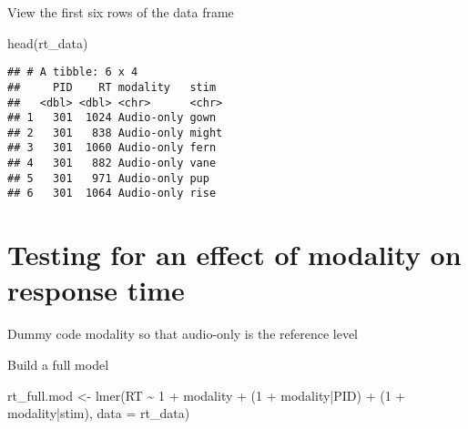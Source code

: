 \documentclass[
]{article}
\newenvironment{Shaded}{\begin{snugshade}}{\end{snugshade}}
\newcommand{\AttributeTok}[1]{\textcolor[rgb]{0.77,0.63,0.00}{#1}}
\newcommand{\DecValTok}[1]{\textcolor[rgb]{0.00,0.00,0.81}{#1}}
\newcommand{\FunctionTok}[1]{\textcolor[rgb]{0.00,0.00,0.00}{#1}}
\newcommand{\NormalTok}[1]{#1}
\newcommand{\OtherTok}[1]{\textcolor[rgb]{0.56,0.35,0.01}{#1}}
\newcommand{\SpecialCharTok}[1]{\textcolor[rgb]{0.00,0.00,0.00}{#1}}
\newcommand{\StringTok}[1]{\textcolor[rgb]{0.31,0.60,0.02}{#1}}
\begin{document}
View the first six rows of the data frame

\begin{Shaded}
\begin{Highlighting}[]
\FunctionTok{head}\NormalTok{(rt\_data)}
\end{Highlighting}
\end{Shaded}

\begin{verbatim}
## # A tibble: 6 x 4
##     PID    RT modality   stim 
##   <dbl> <dbl> <chr>      <chr>
## 1   301  1024 Audio-only gown 
## 2   301   838 Audio-only might
## 3   301  1060 Audio-only fern 
## 4   301   882 Audio-only vane 
## 5   301   971 Audio-only pup  
## 6   301  1064 Audio-only rise
\end{verbatim}

\hypertarget{testing-for-an-effect-of-modality-on-response-time}{%
\section{Testing for an effect of modality on response
time}\label{testing-for-an-effect-of-modality-on-response-time}}

Dummy code modality so that audio-only is the reference level

\begin{Shaded}
\end{Shaded}

Build a full model

\begin{Shaded}
\begin{Highlighting}[]
\NormalTok{rt\_full.mod }\OtherTok{\textless{}{-}} \FunctionTok{lmer}\NormalTok{(RT }\SpecialCharTok{\textasciitilde{}} \DecValTok{1} \SpecialCharTok{+}\NormalTok{ modality }\SpecialCharTok{+} 
\NormalTok{                      (}\DecValTok{1} \SpecialCharTok{+}\NormalTok{ modality}\SpecialCharTok{|}\NormalTok{PID) }\SpecialCharTok{+}\NormalTok{ (}\DecValTok{1} \SpecialCharTok{+}\NormalTok{ modality}\SpecialCharTok{|}\NormalTok{stim), }
                    \AttributeTok{data =}\NormalTok{ rt\_data)}
\end{Highlighting}
\end{Shaded}
\end{document}
